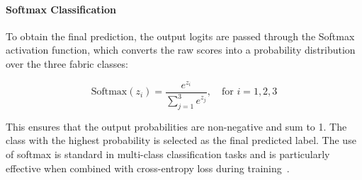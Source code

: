 \paragraph{Softmax Classification}

To obtain the final prediction, the output logits are passed through the Softmax activation function, which converts the raw scores into a probability distribution over the three fabric classes:

\[
\text{Softmax}(z_i) = \frac{e^{z_i}}{\sum_{j=1}^{3} e^{z_j}}, \quad \text{for } i = 1,2,3
\]

This ensures that the output probabilities are non-negative and sum to 1. The class with the highest probability is selected as the final predicted label. The use of softmax is standard in multi-class classification tasks and is particularly effective when combined with cross-entropy loss during training~\cite{bishop2006pattern, goodfellow2016deep}.